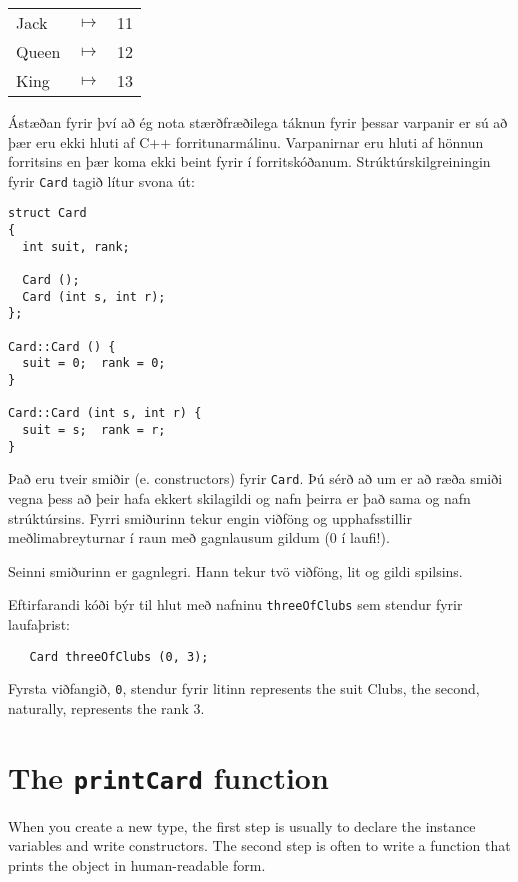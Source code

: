 \vspace{0.1in}
\begin{tabular}{l c l}
Jack & $\mapsto$ & 11 \\
Queen & $\mapsto$ & 12 \\
King & $\mapsto$ & 13 \\
\end{tabular}
\vspace{0.1in}

Ástæðan fyrir því að ég nota stærðfræðilega táknun fyrir þessar varpanir er sú að þær eru ekki hluti af C++ forritunarmálinu.
Varpanirnar eru hluti af hönnun forritsins en þær koma ekki beint fyrir í forritskóðanum.
Strúktúrskilgreiningin fyrir {\tt Card} tagið lítur svona út:

\begin{verbatim}
struct Card
{
  int suit, rank;

  Card ();
  Card (int s, int r);
};

Card::Card () { 
  suit = 0;  rank = 0;
}

Card::Card (int s, int r) { 
  suit = s;  rank = r;
}
\end{verbatim}
%
Það eru tveir smiðir (e. constructors) fyrir {\tt Card}.
Þú sérð að um er að ræða smiði vegna þess að þeir hafa ekkert skilagildi og nafn þeirra er það sama og nafn strúktúrsins.
Fyrri smiðurinn tekur engin viðföng og upphafsstillir meðlimabreyturnar í raun með gagnlausum gildum (0 í laufi!).

Seinni smiðurinn er gagnlegri.
Hann tekur tvö viðföng, lit og gildi spilsins.


Eftirfarandi kóði býr til hlut með nafninu {\tt threeOfClubs} sem stendur fyrir laufaþrist: 

\begin{verbatim}
   Card threeOfClubs (0, 3);
\end{verbatim}
%
Fyrsta viðfangið, {\tt 0}, stendur fyrir litinn represents the suit Clubs, the
second, naturally, represents the rank 3.

\section{The {\tt printCard} function}

When you create a new type, the first step is usually to declare the
instance variables and write constructors.  The second step is often
to write a function that prints the object in human-readable form.

